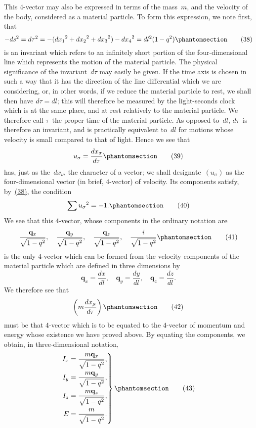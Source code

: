\documentclass[12pt]{book}[2005/09/16]
\newcommand{\Change}[2]{#2}
\newcommand{\Add}[1]{\Change{}{#1}}
\newcommand{\PageSep}[1]{\ignorespaces}
\newcommand{\Tag}[1]{%
  \phantomsection
  \label{eqn:#1}
  \tag*{#1}
}
\newcommand{\Eqref}[1]{\hyperref[eqn:#1]{#1}}
\newcommand{\Vector}[1]{\mathbf{#1}}
\newcommand{\veci}{\Vector{i}}
\newcommand{\q}{\Vector{q}}
\begin{document}
This $4$-vector may also be expressed in terms of the
mass~$m$, and the velocity of the body, considered as a
material particle. To form this expression, we note first,
that
\[
-ds^{2} = d\tau^{2}
  = - ({dx_{1}}^{2} + {dx_{2}}^{2} + {dx_{3}}^{2}) - {dx_{4}}^{2}
  = dl^{2}(1 - q^{2})
\Tag{(38)}
\]
is an invariant which refers to an infinitely short portion
of the four-dimensional line which represents the motion
of the material particle. The physical significance of the
invariant~$d\tau$ may easily be given. If the time axis is
chosen in such a way that it has the direction of the line
differential which we are considering, or, in other words,
if we reduce the material particle to rest, we shall then
have $d\tau = dl$; this will therefore be measured by the
light-seconds clock which is at the same place, and at
rest relatively to the material particle. We therefore call
\PageSep{50}
$\tau$~the proper time of the material particle. As opposed
to~$dl$, $d\tau$~is therefore an invariant, and is practically
equivalent to~$dl$ for motions whose velocity is small
compared to that of light. Hence we see that
\[
u_{\sigma} = \frac{dx_{\sigma}}{d\tau}
\Tag{(39)}
\]
has, just as the~$dx_{\nu}$, the character of a vector; we shall
designate~$(u_{\sigma})$ as the four-dimensional vector (in brief,
$4$-vector) of velocity. Its components satisfy, by~\Eqref{(38)},
the condition
\[
\sum {u_{\sigma}}^{2} = -1\Add{.}
\Tag{(40)}
\]
We see that this $4$-vector, whose components in the
ordinary notation are
\[
\frac{\q_{x}}{\sqrt{1 - q^{2}}},\quad
\frac{\q_{y}}{\sqrt{1 - q^{2}}},\quad
\frac{\q_{z}}{\sqrt{1 - q^{2}}},\quad
\frac{\Change{\veci}{i}}{\sqrt{1 - q^{2}}}
\Tag{(41)}
\]
is the only $4$-vector which can be formed from the velocity
components of the material particle which are defined in
three dimensions by
\[
\q_{x} = \frac{dx}{dl},\quad
\q_{y} = \frac{dy}{dl},\quad
\q_{z} = \frac{dz}{dl}.
\]
We therefore see that
\[
\left(m \frac{dx_{\mu}}{d\tau}\right)
\Tag{(42)}
\]
must be that $4$-vector which is to be equated to the
$4$-vector of momentum and energy whose existence we
have proved above. By equating the components, we
obtain, in three-dimensional notation,
\PageSep{51}
\[
\left.
\begin{aligned}
I_{x} &= \frac{m\q_{x}}{\sqrt{1 - q^{2}}}\Add{,} \\
I_{y} &= \frac{m\q_{y}}{\sqrt{1 - q^{2}}}\Add{,} \\
I_{z} &= \frac{m\q_{z}}{\sqrt{1 - q^{2}}}\Add{,} \\
E &= \frac{m}{\sqrt{1 - q^{2}}}\Add{.}
\end{aligned}
\right\}
\Tag{(43)}
\]
\end{document}
